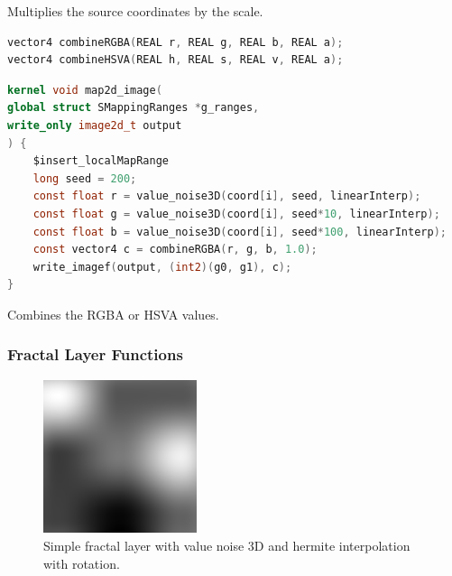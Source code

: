 Multiplies the source coordinates by the scale.

\begin{lstlisting}[caption={Definition of combine color values functions},label={lst:combine_color_definition},language=OpenCL]
vector4 combineRGBA(REAL r, REAL g, REAL b, REAL a);
vector4 combineHSVA(REAL h, REAL s, REAL v, REAL a);
\end{lstlisting}

\begin{lstlisting}[caption={Example for scale domain function},label={lst:combine_color_example},language=OpenCL]
kernel void map2d_image(
global struct SMappingRanges *g_ranges,
write_only image2d_t output
) {
    $insert_localMapRange
    long seed = 200;
    const float r = value_noise3D(coord[i], seed, linearInterp);
    const float g = value_noise3D(coord[i], seed*10, linearInterp);
    const float b = value_noise3D(coord[i], seed*100, linearInterp);
    const vector4 c = combineRGBA(r, g, b, 1.0);
    write_imagef(output, (int2)(g0, g1), c);
}
\end{lstlisting}

Combines the RGBA or HSVA values.

\subsubsection{Fractal Layer Functions}

\begin{figure}[h]
\centering
\includegraphics[width=0.4\textwidth]{out/simpleFractalLayer3/simpleFractalLayer3_value_noise3D_hermiteInterp_rot.png}
\caption{Simple fractal layer with value noise 3D and hermite interpolation with rotation.}
\label{fig:simple_fractal_layer3_value_noise3D_hermiteInterp_rot}
\end{figure}

